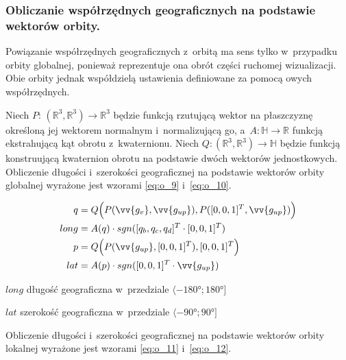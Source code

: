 \subsubsection{Obliczanie współrzędnych geograficznych na podstawie wektorów orbity.}
Powiązanie współrzędnych geograficznych z~orbitą ma sens tylko w~przypadku orbity globalnej, ponieważ reprezentuje ona obrót części ruchomej wizualizacji. Obie orbity jednak współdzielą ustawienia definiowane za pomocą owych współrzędnych.

Niech $P:\,(\mathbb{R}^3, \mathbb{R}^3) \to \mathbb{R}^3$ będzie funkcją rzutującą wektor na płaszczyznę określoną jej wektorem normalnym i~normalizującą go, a~$A: \mathbb{H} \to \mathbb{R}$ funkcją ekstrahującą kąt obrotu z~kwaternionu. Niech $Q:(\mathbb{R}^3, \mathbb{R}^3) \to \mathbb{H}$ będzie funkcją konstruującą kwaternion obrotu na podstawie dwóch wektorów jednostkowych. Obliczenie długości i~szerokości geograficznej na podstawie wektorów orbity globalnej wyrażone jest wzorami \ref{eq:o_9} i~\ref{eq:o_10}.

\begin{samepage}
  \begin{align}
    q &= Q\Big(P(\vv{g_v}, \vv{g_{up}}), P([0, 0, 1]^T, \vv{g_{up}})\Big) \\
    \label{eq:o_9}
    long &= A(q) \cdot sgn([q_b, q_c, q_d]^T \cdot [0, 0, 1]^T) \\
    p &= Q\Big(P(\vv{g_{up}}, [0, 0, 1]^T), [0, 0, 1]^T\Big) \\
    \label{eq:o_10}
    lat &= A(p) \cdot sgn([0, 0, 1]^T \cdot \vv{g_{up}})
  \end{align}
\begin{eqexpl}[25mm]
    \item {$long$} długość geograficzna w~przedziale $\langle\ang{-180}; \ang{180}\rbrack$
    \item {$lat$} szerokość geograficzna w~przedziale $\langle\ang{-90}; \ang{90}\rbrack$
\end{eqexpl}
  \vspace{\baselineskip}
\end{samepage}

Obliczenie długości i~szerokości geograficznej na podstawie wektorów orbity lokalnej wyrażone jest wzorami \ref{eq:o_11} i~\ref{eq:o_12}.

